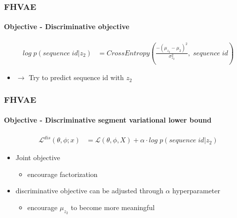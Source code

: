\documentclass[9pt]{beamer}
\begin{document}
\begin{frame}
\frametitle{FHVAE}
\framesubtitle{Objective - Discriminative objective}
\begin{align*}
log\;p(sequence\;id | z_2)& = CrossEntropy(\frac{-(\mu_{z_2} - \mu_2)^2}{\sigma_{z_2}^2},\;sequence\;id)
\end{align*}
\begin{itemize}
	\item $\rightarrow$ Try to predict sequence id with $z_2$
\end{itemize}
\end{frame} 



\begin{frame}
\frametitle{FHVAE}
\framesubtitle{Objective - Discriminative segment variational lower bound}
\begin{align*}
\mathcal{L}^{dis}(\theta, \phi;x)& = \mathcal{L}(\theta, \phi, X) + \alpha \cdot log\;p(sequence\;id | z_2)
\end{align*}
\begin{itemize}
	\item Joint objective
	\begin{itemize}
		\item encourage factorization
	\end{itemize}
	\item discriminative objective can be adjusted through $\alpha$ hyperparameter
	\begin{itemize}
		\item encourage $\mu_{z_2}$ to become more meaningful
	\end{itemize}
\end{itemize}
\end{frame} 

\end{document}
